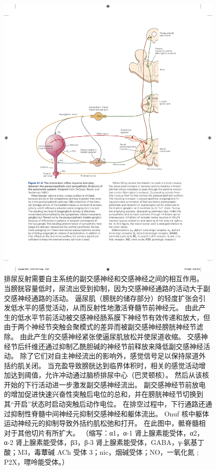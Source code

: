 \begin{figure}[htbp]
	\centering
	\includegraphics[width=0.9\linewidth]{chap41/fig_41_8}
	\caption{排尿反射需要自主系统的副交感神经和交感神经之间的相互作用\cite{de1993neurophysiology}。
		当膀胱容量低时，尿流出受到抑制，因为交感神经通路的活动大于副交感神经通路的活动。
		逼尿肌（膀胱的储存部分）的轻度扩张会引发低水平的感觉活动，从而反射性地激活脊髓节前神经元。
		由此产生的低水平节前活动被交感神经肠系膜下神经节有效传递和放大，但由于两个神经节突触会聚模式的差异而被副交感神经膀胱神经节滤除。
		由此产生的交感神经紧张使逼尿肌放松并使尿道收缩。
		交感神经节后纤维还通过抑制乙酰胆碱的神经节前释放来降低副交感神经活动。
		除了它们对自主神经流出的影响外，感觉信号足以保持尿道外括约肌关闭。
		当充盈导致膀胱达到临界体积时，相关的感觉活动增加达到阈值，允许冲动通过脑桥排尿中心（巴灵顿核）。
		然后从该核开始的下行活动进一步激发副交感神经流出。
		副交感神经节前放电的增加促进快速兴奋性突触后电位的总和，并在膀胱神经节切换到其“开启”状态时启动突触后动作电位。
		在排空过程中，下行通路还通过抑制性脊髓中间神经元抑制交感神经和躯体流出。
		Onuf 核中躯体运动神经元的抑制导致外括约肌松弛和打开。
		在此图中，骶脊髓相对于其他切片有所扩大。 （缩写：α1，α-1 肾上腺素能受体，α2，α-2 肾上腺素能受体，β3，β-3 肾上腺素能受体，GABA，γ-氨基丁酸；M3，毒蕈碱 ACh 受体 3；nic，烟碱受体；NO，一氧化氮 ; P2X，嘌呤能受体。）}
	\label{fig:41_8}
\end{figure}


